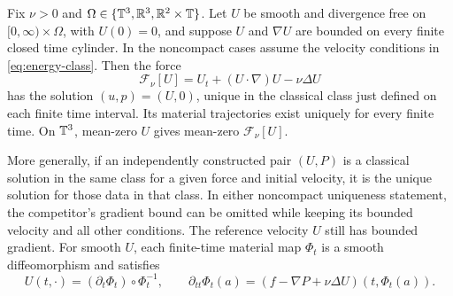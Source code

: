 \begin{lemma}\label{lem:realization}
Fix $\nu>0$ and $\Omega\in\{\mathbb T^3,\mathbb R^3,\mathbb R^2\times\mathbb T\}$.
Let $U$ be smooth and divergence free on $[0,\infty)\times\Omega$,
with $U(0)=0$, and suppose $U$ and $\nabla U$ are bounded on every
finite closed time cylinder. In the noncompact cases assume the
velocity conditions in \eqref{eq:energy-class}. Then the force
\[
 \mathcal F_\nu[U]=U_t+(U\cdot\nabla)U-\nu\Delta U
\]
has the solution $(u,p)=(U,0)$, unique in the classical class just
defined on each finite time interval. Its material trajectories exist
uniquely for every finite time. On $\mathbb T^3$, mean-zero $U$ gives
mean-zero $\mathcal F_\nu[U]$.

More generally, if an independently constructed pair $(U,P)$ is a
classical solution in the same class for a given force and initial
velocity, it is the unique solution for those data in that class.
In either noncompact uniqueness statement, the competitor's gradient
bound can be omitted while keeping its bounded velocity and all other
conditions. The reference velocity $U$ still has bounded gradient.
For smooth $U$, each finite-time material map $\Phi_t$ is a smooth
diffeomorphism and satisfies
\[
 U(t,\cdot)=(\partial_t\Phi_t)\circ\Phi_t^{-1},\qquad
 \partial_{tt}\Phi_t(a)
   =(f-\nabla P+\nu\Delta U)(t,\Phi_t(a)).
\]
\end{lemma}
